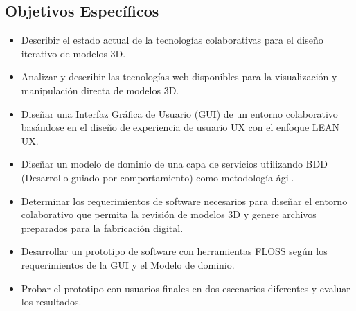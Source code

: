 \subsection {Objetivos Específicos}
\begin{itemize}
  \item Describir el estado actual de la tecnologías colaborativas para el diseño iterativo de modelos 3D.
  \item Analizar y describir las tecnologías web disponibles para la visualización y manipulación directa de modelos 3D.
  \item Diseñar una Interfaz Gráfica de Usuario (GUI) de un entorno colaborativo basándose en el diseño de experiencia de usuario UX con el enfoque LEAN UX.
  \item Diseñar un modelo de dominio de una capa de servicios utilizando BDD (Desarrollo guiado por comportamiento) como metodología ágil.
  \item Determinar los requerimientos de software necesarios para diseñar el entorno colaborativo que permita la revisión de modelos 3D y genere archivos preparados para la fabricación digital.
  \item Desarrollar un prototipo de software con herramientas FLOSS según los requerimientos de la GUI y el Modelo de dominio.
  \item Probar el prototipo con usuarios finales en dos escenarios diferentes y evaluar los resultados.
\end{itemize}





